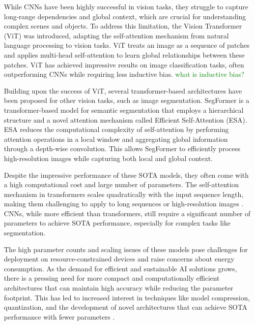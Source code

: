 \documentclass[conference]{IEEEtran}
\newcommand{\gr}[1]{\textcolor{green}{#1}}
\begin{document}
While CNNs have been highly successful in vision tasks, they struggle to capture long-range dependencies and global context, which are crucial for understanding complex scenes and objects. To address this limitation, the Vision Transformer (ViT) \cite{dosovitskiy2021image} was introduced, adapting the self-attention mechanism from natural language processing to vision tasks. ViT treats an image as a sequence of patches and applies multi-head self-attention to learn global relationships between these patches. ViT has achieved impressive results on image classification tasks, often outperforming CNNs while requiring less inductive bias. \gr{what is inductive bias?}

Building upon the success of ViT, several transformer-based architectures have been proposed for other vision tasks, such as image segmentation. SegFormer \cite{xie2021segformer} is a transformer-based model for semantic segmentation that employs a hierarchical structure and a novel attention mechanism called Efficient Self-Attention (ESA). ESA reduces the computational complexity of self-attention by performing attention operations in a local window and aggregating global information through a depth-wise convolution. This allows SegFormer to efficiently process high-resolution images while capturing both local and global context.

Despite the impressive performance of these SOTA models, they often come with a high computational cost and large number of parameters. The self-attention mechanism in transformers scales quadratically with the input sequence length, making them challenging to apply to long sequences or high-resolution images \cite{choromanski2020rethinking}. CNNs, while more efficient than transformers, still require a significant number of parameters to achieve SOTA performance, especially for complex tasks like segmentation.

The high parameter counts and scaling issues of these models pose challenges for deployment on resource-constrained devices and raise concerns about energy consumption. As the demand for efficient and sustainable AI solutions grows, there is a pressing need for more compact and computationally efficient architectures that can maintain high accuracy while reducing the parameter footprint. This has led to increased interest in techniques like model compression, quantization, and the development of novel architectures that can achieve SOTA performance with fewer parameters \cite{cheng2017survey, hinton2015distilling}.
\end{document}
